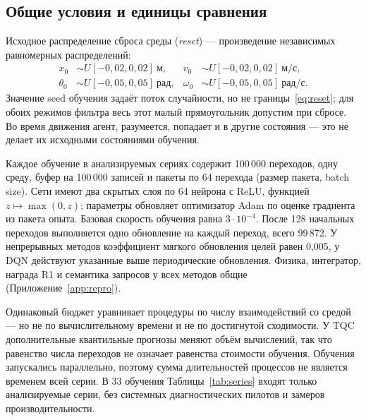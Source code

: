 \subsection{Общие условия и единицы сравнения}
Исходное распределение сброса среды (\emph{reset}) — произведение независимых равномерных распределений:
\begin{equation}
\begin{aligned}
x_0&\sim U[-0{,}02,0{,}02]\ \text{м}, &v_0&\sim U[-0{,}02,0{,}02]\ \text{м/с},\\
\theta_0&\sim U[-0{,}05,0{,}05]\ \text{рад}, &\omega_0&\sim U[-0{,}05,0{,}05]\ \text{рад/с}.
\end{aligned}\label{eq:reset}
\end{equation}
Значение seed обучения задаёт поток случайности, но не границы~\eqref{eq:reset}; для обоих режимов фильтра весь этот малый прямоугольник допустим при сбросе. Во время движения агент, разумеется, попадает и в другие состояния — это не делает их исходными состояниями обучения.

Каждое обучение в анализируемых сериях содержит 100\,000 переходов, одну среду, буфер на 100\,000 записей и пакеты по 64 перехода (размер пакета, batch size). Сети имеют два скрытых слоя по 64 нейрона с ReLU, функцией $z\mapsto\max(0,z)$; параметры обновляет оптимизатор Adam по оценке градиента из пакета опыта. Базовая скорость обучения равна $3\cdot10^{-4}$. После 128 начальных переходов выполняется одно обновление на каждый переход, всего 99\,872. У непрерывных методов коэффициент мягкого обновления целей равен 0,005, у DQN действуют указанные выше периодические обновления. Физика, интегратор, награда R1 и семантика запросов у всех методов общие (Приложение~\ref{app:repro}).

Одинаковый бюджет уравнивает процедуры по числу взаимодействий со средой — но не по вычислительному времени и не по достигнутой сходимости. У TQC дополнительные квантильные прогнозы меняют объём вычислений, так что равенство числа переходов не означает равенства стоимости обучения. Обучения запускались параллельно, поэтому сумма длительностей процессов не является временем всей серии. В 33 обучения Таблицы~\ref{tab:series} входят только анализируемые серии, без системных диагностических пилотов и замеров производительности.

